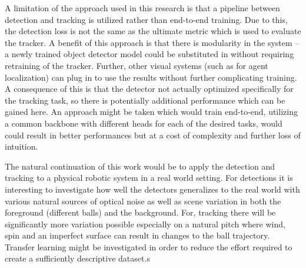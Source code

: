 \documentclass[a4paper,twoside,12pt]{report}
\begin{document}
A limitation of the approach used in this research is that a pipeline between detection and tracking is utilized rather than end-to-end training. Due to this, the detection loss is not the same as the ultimate metric which is used to evaluate the tracker. A benefit of this approach is that there is modularity in the system -- a newly trained object detector model could be substituted in without requiring retraining of the tracker. Further, other visual systems (such as for agent localization) can plug in to use the results without further complicating training. A consequence of this is that the detector not actually optimized specifically for the tracking task, so there is potentially additional performance which can be gained here. An approach might be taken which would train end-to-end, utilizing a common backbone with different heads for each of the desired tasks, would could result in better performances but at a cost of complexity and further loss of intuition.

The natural continuation of this work would be to apply the detection and tracking to a physical robotic system in a real world setting. For detections it is interesting to investigate how well the detectors generalizes to the real world with various natural sources of optical noise as well as scene variation in both the foreground (different balls) and the background. For, tracking there will be significantly more variation possible especially on a natural pitch where wind, spin and an imperfect surface can result in changes to the ball trajectory. Transfer learning might be investigated in order to reduce the effort required to create a sufficiently descriptive dataset.s

%



\end{document}
